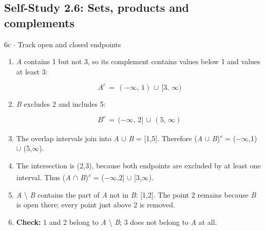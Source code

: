 \documentclass[11pt]{article}
\begin{document}
\begin{keepsection}\subsection{Self-Study 2.6: Sets, products and complements}

\begin{workedbox}{6c \ensuremath{\cdot} Track open and closed endpoints}
\begin{enumerate}
\item {}
\textit{A} contains 1 but not 3, so its complement contains values below 1 and values at least 3:

\begin{equation*}{A}^{{c}}\, =\, (-\infty ,\, 1)\, \cup \, [3,\, \infty )\end{equation*}
\item {}
\textit{B} excludes 2 and includes 5:

\begin{equation*}{B}^{{c}}\, =\, (-\infty ,\, 2]\, \cup \, (5,\, \infty )\end{equation*}
\item The overlap intervals join into \textit{A} \ensuremath{\cup} \textit{B} = [1,5]. Therefore (\textit{A} \ensuremath{\cup} \textit{B})\textsuperscript{\textit{c}} = (\ensuremath{-}\ensuremath{\infty},1) \ensuremath{\cup} (5,\ensuremath{\infty}).
\item The intersection is (2,3), because both endpoints are excluded by at least one interval. Thus (\textit{A} \ensuremath{\cap} \textit{B})\textsuperscript{\textit{c}} = (\ensuremath{-}\ensuremath{\infty},2] \ensuremath{\cup} [3,\ensuremath{\infty}).
\item \textit{A} \textbackslash{} \textit{B} contains the part of \textit{A} not in \textit{B}: [1,2]. The point 2 remains because \textit{B} is open there; every point just above 2 is removed.
\item \textbf{Check:} 1 and 2 belong to \textit{A} \textbackslash{} \textit{B}; 3 does not belong to \textit{A} at all.
\end{enumerate}
\end{workedbox}

\end{keepsection}
\end{document}
